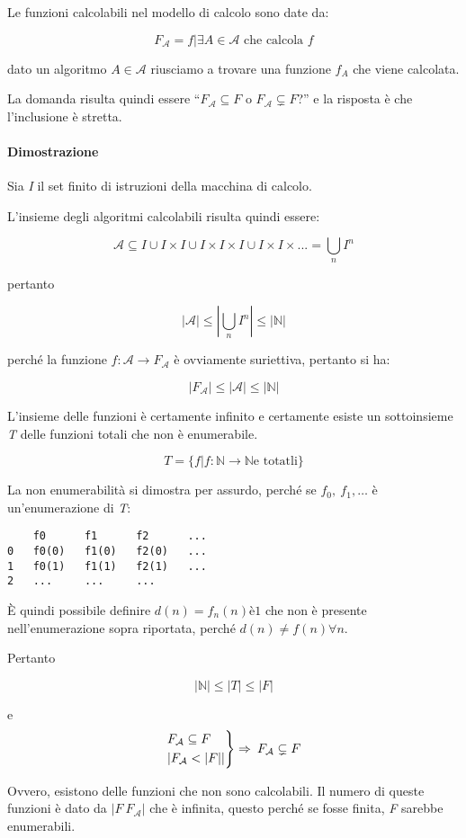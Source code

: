 Le funzioni calcolabili nel modello di calcolo sono date da:

$$
F_\mathcal{A} = {f | \exists A \in \mathcal{A} \text{ che calcola } f}
$$

dato un algoritmo $ A \in \mathcal{A}$ riusciamo a trovare una funzione $f_A$ che
viene calcolata.

La domanda risulta quindi essere ``$F_\mathcal{A} \subseteq F$ o $ F_\mathcal{A} \subsetneq F $?'' e la risposta è che l'inclusione è stretta.

\paragraph{Dimostrazione}\label{dimostrazione}

Sia \emph{I} il set finito di istruzioni della macchina di calcolo.

L'insieme degli algoritmi calcolabili risulta quindi essere:

$$
\mathcal{A} \subseteq I \cup I \times I \cup I \times I \times I \cup I \times I \times ... = \bigcup_n I^n
$$

pertanto

$$
|\mathcal{A}| \leq |\bigcup_n I^n| \leq |\mathbb{N}|
$$

perché la funzione $ f: \mathcal{A} \rightarrow F_\mathcal{A}$  è
ovviamente suriettiva, pertanto si ha:

$$
|F_\mathcal{A}| \leq |\mathcal{A}| \leq |\mathbb{N}|
$$

L'insieme delle funzioni è certamente infinito e certamente esiste un
sottoinsieme \emph{T} delle funzioni totali che non è enumerabile.

$$
T = \{ f | f : \mathbb{N} \rightarrow \mathbb{N} \text{e totatli}\}
$$

La non enumerabilità si dimostra per assurdo, perché se
$f_0,\ f_1, \ldots$ è un'enumerazione di \emph{T}:

\begin{verbatim}
    f0      f1      f2      ...
0   f0(0)   f1(0)   f2(0)   ...
1   f0(1)   f1(1)   f2(1)   ...
2   ...     ...     ...
\end{verbatim}

È quindi possibile definire  $d(n) = f_n(n) è 1$ che non è
presente nell'enumerazione sopra riportata, perché $ d(n) \neq f(n) \forall n$.

Pertanto 

$$ |\mathbb{N}| \leq |T| \leq |F|$$

e
$$
\begin{rcases}
F_\mathcal{A} \subseteq F \\
|F_\mathcal{A} < |F||
\end{rcases}
 \Rightarrow \: F_\mathcal{A} \subsetneq F
$$

Ovvero, esistono delle funzioni che non sono calcolabili. Il numero di
queste funzioni è dato da $ | F \ F_\mathcal{A}| $ che è
infinita, questo perché se fosse finita, \textit{F} sarebbe enumerabili.
